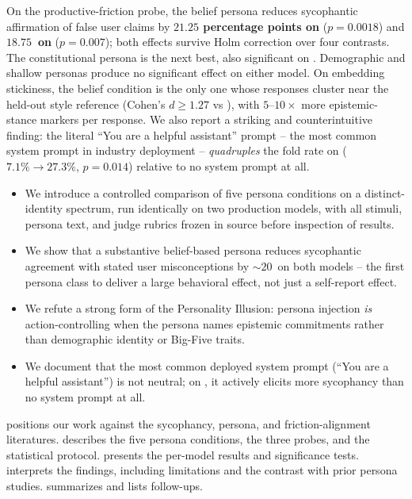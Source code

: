 On the productive-friction probe, the belief persona reduces sycophantic affirmation of false user claims by \textbf{\(21.25\) percentage points on \gptone} (\(p=0.0018\)) and \textbf{\(18.75\)~\pp on \gptmini} (\(p=0.007\)); both effects survive Holm correction over four contrasts. The constitutional persona is the next best, also significant on \gptone. Demographic and shallow personas produce no significant effect on either model. On embedding stickiness, the belief condition is the only one whose responses cluster near the held-out style reference (Cohen's \(d \geq 1.27\) vs \pnone), with \(5\)--\(10\times\) more epistemic-stance markers per response. We also report a striking and counterintuitive finding: the literal ``You are a helpful assistant'' prompt -- the most common system prompt in industry deployment -- \emph{quadruples} the fold rate on \gptone (\(7.1\% \to 27.3\%\), \(p=0.014\)) relative to no system prompt at all.

\begin{itemize}[leftmargin=*,itemsep=0pt,topsep=0pt]
    \item We introduce a controlled comparison of five persona conditions on a distinct-identity spectrum, run identically on two production models, with all stimuli, persona text, and judge rubrics frozen in source before inspection of results.
    \item We show that a substantive belief-based persona reduces sycophantic agreement with stated user misconceptions by \(\sim 20\)~\pp on both models -- the first persona class to deliver a large behavioral effect, not just a self-report effect.
    \item We refute a strong form of the Personality Illusion: persona injection \emph{is} action-controlling when the persona names epistemic commitments rather than demographic identity or Big-Five traits.
    \item We document that the most common deployed system prompt (``You are a helpful assistant'') is not neutral; on \gptone, it actively elicits more sycophancy than no system prompt at all.
\end{itemize}

  positions our work against the sycophancy, persona, and friction-alignment literatures.  describes the five persona conditions, the three probes, and the statistical protocol.  presents the per-model results and significance tests.  interprets the findings, including limitations and the contrast with prior persona studies.  summarizes and lists follow-ups.
